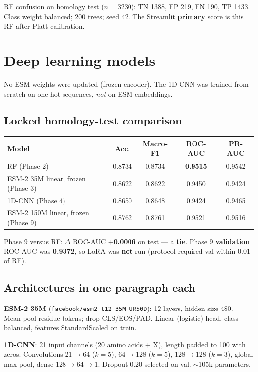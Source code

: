 \documentclass[11pt,a4paper]{report}
\begin{document}
RF confusion on homology test ($n=3230$): TN 1388, FP 219, FN 190, TP 1433. Class weight balanced; 200 trees; seed 42. The Streamlit \textbf{primary} score is this RF after Platt calibration.

\chapter{Deep learning models}
\label{ch:dl}

No ESM weights were updated (frozen encoder). The 1D-CNN was trained from scratch on one-hot sequences, \emph{not} on ESM embeddings.

\section{Locked homology-test comparison}

\begin{tabular}{lcccc}
\toprule
Model & Acc. & Macro-F1 & ROC-AUC & PR-AUC \\
\midrule
RF (Phase 2) & 0.8734 & 0.8734 & \textbf{0.9515} & 0.9542 \\
ESM-2 35M linear, frozen (Phase 3) & 0.8622 & 0.8622 & 0.9450 & 0.9424 \\
1D-CNN (Phase 4) & 0.8650 & 0.8648 & 0.9424 & 0.9465 \\
ESM-2 150M linear, frozen (Phase 9) & 0.8762 & 0.8761 & 0.9521 & 0.9516 \\
\bottomrule
\end{tabular}

Phase 9 versus RF: $\Delta$ ROC-AUC \textbf{$+$0.0006} on test --- a \textbf{tie}. Phase 9 \textbf{validation} ROC-AUC was \textbf{0.9372}, so LoRA was \textbf{not} run (protocol required val within 0.01 of RF).

\section{Architectures in one paragraph each}

\textbf{ESM-2 35M} (\texttt{facebook/esm2\_t12\_35M\_UR50D}): 12 layers, hidden size 480. Mean-pool residue tokens; drop CLS/EOS/PAD. Linear (logistic) head, class-balanced, features StandardScaled on train.

\textbf{1D-CNN}: 21 input channels (20 amino acids $+$ X), length padded to 100 with zeros. Convolutions 21$\rightarrow$64 ($k=5$), 64$\rightarrow$128 ($k=5$), 128$\rightarrow$128 ($k=3$), global max pool, dense 128$\rightarrow$64$\rightarrow$1. Dropout 0.20 selected on val. $\sim$105k parameters.
\end{document}
